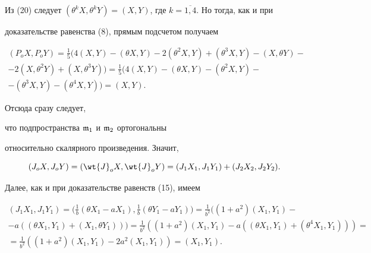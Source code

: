\begin{pf}


Из (20) следует $(\theta^k X, \theta^k Y)


=(X, Y)$, где $k=\overline{1,4}$. Но тогда, как и при


доказательстве равенства (8), прямым подсчетом получаем


\begin{multline*}


(P_oX,P_oY) = \frac{1}{5}(4(X,Y) - (\theta X,Y) - 2(\theta^2X, Y)


+(\theta^3X,Y) - (X, \theta Y) -\\


-2(X, \theta^2 Y) + (X,


\theta^3Y))=\frac{1}{5}(4(X,Y) - (\theta X, Y) - (\theta^2X,Y) - \\


- (\theta^3X,Y) - (\theta^4X,Y)) =(X,Y).


\end{multline*}


Отсюда сразу следует,


что подпространства $\frak{m}_1$ и $\frak{m}_2$ ортогональны


относительно скалярного произведения. Значит,


$$


(J_oX,J_oY) =(\wt{J}_oX, \wt{J}_oY) = (J_1X_1,J_1Y_1) + (J_2X_2,


J_2Y_2).


$$


Далее, как и при доказательстве равенств (15), имеем


\begin{multline*}


(J_1X_1,J_1Y_1)=\bigg(\frac{1}{b}(\theta


X_1-aX_1),\frac{1}{b}(\theta Y_1-aY_1)\bigg)=


\frac{1}{b^2}((1+a^2)(X_1,Y_1)-\\


-a((\theta X_1,Y_1)+(X_1,\theta


Y_1)))= \frac{1}{b^2}((1+a^2)(X_1,Y_1)-a((\theta


X_1,Y_1)+(\theta^4X_1, Y_1)))= \\


=


\frac{1}{b^2}((1+a^2)(X_1,Y_1)- 2a^2(X_1,Y_1))=(X_1,Y_1).


\end{multline*}



\end{pf}
